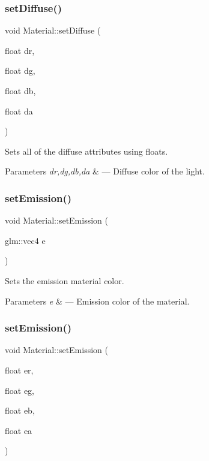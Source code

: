 \subsubsection{\texorpdfstring{set\+Diffuse()}{setDiffuse()}\hspace{0.1cm}{\footnotesize\ttfamily [2/2]}}
{\footnotesize\ttfamily void Material\+::set\+Diffuse (\begin{DoxyParamCaption}\item[{float}]{dr,  }\item[{float}]{dg,  }\item[{float}]{db,  }\item[{float}]{da }\end{DoxyParamCaption})}



Sets all of the diffuse attributes using floats. 


\begin{DoxyParams}{Parameters}
{\em dr,dg,db,da} & --- Diffuse color of the light. \\
\hline
\end{DoxyParams}
\mbox{\label{class_material_ace85799daadb777e5ce13b0326a84895}} 
\subsubsection{\texorpdfstring{set\+Emission()}{setEmission()}\hspace{0.1cm}{\footnotesize\ttfamily [1/2]}}
{\footnotesize\ttfamily void Material\+::set\+Emission (\begin{DoxyParamCaption}\item[{glm\+::vec4}]{e }\end{DoxyParamCaption})}



Sets the emission material color. 


\begin{DoxyParams}{Parameters}
{\em e} & --- Emission color of the material. \\
\hline
\end{DoxyParams}
\mbox{\label{class_material_ab74b07e791097ac543577b178a673b49}} 
\subsubsection{\texorpdfstring{set\+Emission()}{setEmission()}\hspace{0.1cm}{\footnotesize\ttfamily [2/2]}}
{\footnotesize\ttfamily void Material\+::set\+Emission (\begin{DoxyParamCaption}\item[{float}]{er,  }\item[{float}]{eg,  }\item[{float}]{eb,  }\item[{float}]{ea }\end{DoxyParamCaption})}



